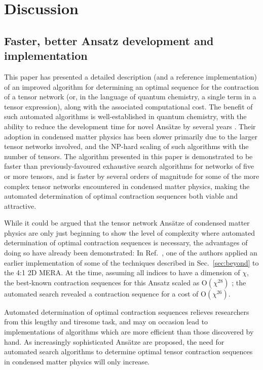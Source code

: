 \documentclass[aps,pre,reprint,superscriptaddress,amsfonts,amsmath,showpacs,nofootinbib,floatfix]{revtex4-1}
\newcommand{\mrm}[1]{\mathrm{#1}}
\newcommand{\sref}[1]{Sec.~\ref{#1}}
\newcommand{\rcite}[1]{Ref.~\onlinecite{#1}}
\newcommand{\OO}[1]{\mrm{O}(#1)}
\begin{document}
\section{Discussion}

\subsection{Faster, better Ansatz development and implementation}

This paper has presented a detailed description (and a reference implementation) of an improved algorithm for determining an optimal sequence for the contraction of a tensor network (or, in the language of quantum chemistry, a single term in a tensor expression), along with the associated computational cost. The benefit of such automated algorithms is well-established in quantum chemistry, with the ability to reduce the development time for novel Ans\"atze by several years \cite{auer2006}. Their adoption in condensed matter physics has been slower primarily due to the larger tensor networks involved, and the NP-hard scaling of such algorithms with the number of tensors. The algorithm presented in this paper is demonstrated to be faster than previously-favoured exhaustive search algorithms for networks of five or more tensors, and is faster by several orders of magnitude for some of the more complex tensor networks encountered in condensed matter physics, making the automated determination of optimal contraction sequences both viable and attractive.

While it could be argued that the tensor network Ans\"atze of condensed matter physics are only just beginning to show the level of complexity where automated determination of optimal contraction sequences is necessary, the advantages of doing so have already been demonstrated: In \rcite{pfeifer2013}, one of the authors applied an earlier implementation of some of the techniques described in \sref{sec:beyond} to the 4:1 2D MERA. At the time, assuming all indices to have a dimension of $\chi$, the best-known contraction sequences for this Ansatz scaled as $\OO{\chi^{28}}$ \cite{evenbly2009b}; the automated search revealed a contraction sequence for a cost of $\OO{\chi^{26}}$.

Automated determination of optimal contraction sequences relieves researchers from this lengthy and tiresome task, and may on occasion lead to implementations of algorithms which are more efficient than those discovered by hand. As increasingly sophisticated Ans\"atze are proposed, the need for automated search algorithms to determine optimal tensor contraction sequences in condensed matter physics will only increase.
\end{document}
